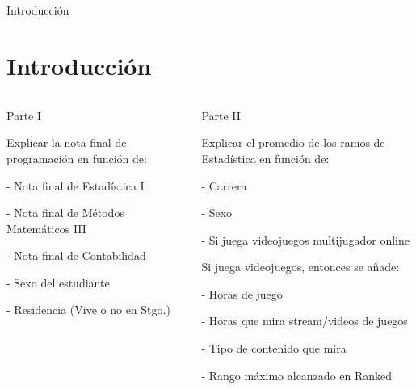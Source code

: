 \documentclass[pdf]{beamer}
\begin{document}
\begin{frame}{Introducción}
\section{Introducción}

\begin{columns}[t]
        \begin{column}{.5\textwidth}
        
            Parte I

            \begin{footnotesize}
            
            Explicar la nota final de programación
            en función de:

            - Nota final de Estadística I
            
            - Nota final de Métodos Matemáticos III
            
            - Nota final de Contabilidad
            
            - Sexo del estudiante
            
            - Residencia (Vive o no en Stgo.)

            \end{footnotesize}
            
        \end{column}
        \begin{column}{.5\textwidth}
        
            Parte II

            \begin{footnotesize}
            
            Explicar el promedio de los ramos de Estadística
            en función de:

            - Carrera
            
            - Sexo
            
            - Si juega videojuegos multijugador online
            
            Si juega videojuegos, entonces se añade:

            - Horas de juego

            - Horas que mira stream/videos de juegos

            - Tipo de contenido que mira

            - Rango máximo alcanzado en Ranked
            
            \end{footnotesize}
            
        \end{column}
\end{columns}


\end{frame}
\end{document}
